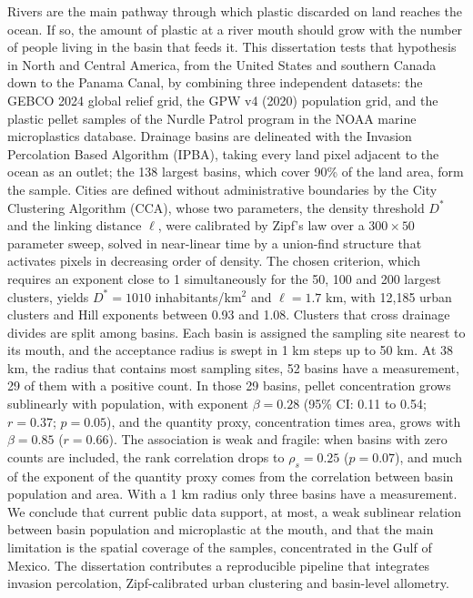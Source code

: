Rivers are the main pathway through which plastic discarded on land reaches the ocean. If so, the amount of plastic at a river mouth should grow with the number of people living in the basin that feeds it. This dissertation tests that hypothesis in North and Central America, from the United States and southern Canada down to the Panama Canal, by combining three independent datasets: the GEBCO 2024 global relief grid, the GPW v4 (2020) population grid, and the plastic pellet samples of the Nurdle Patrol program in the NOAA marine microplastics database. Drainage basins are delineated with the Invasion Percolation Based Algorithm (IPBA), taking every land pixel adjacent to the ocean as an outlet; the 138 largest basins, which cover 90\% of the land area, form the sample. Cities are defined without administrative boundaries by the City Clustering Algorithm (CCA), whose two parameters, the density threshold $D^{*}$ and the linking distance $\ell$, were calibrated by Zipf's law over a $300 \times 50$ parameter sweep, solved in near-linear time by a union-find structure that activates pixels in decreasing order of density. The chosen criterion, which requires an exponent close to 1 simultaneously for the 50, 100 and 200 largest clusters, yields $D^{*} = 1010$ inhabitants/km$^2$ and $\ell = 1.7$ km, with 12,185 urban clusters and Hill exponents between 0.93 and 1.08. Clusters that cross drainage divides are split among basins. Each basin is assigned the sampling site nearest to its mouth, and the acceptance radius is swept in 1 km steps up to 50 km. At 38 km, the radius that contains most sampling sites, 52 basins have a measurement, 29 of them with a positive count. In those 29 basins, pellet concentration grows sublinearly with population, with exponent $\beta = 0.28$ (95\% CI: 0.11 to 0.54; $r = 0.37$; $p = 0.05$), and the quantity proxy, concentration times area, grows with $\beta = 0.85$ ($r = 0.66$). The association is weak and fragile: when basins with zero counts are included, the rank correlation drops to $\rho_s = 0.25$ ($p = 0.07$), and much of the exponent of the quantity proxy comes from the correlation between basin population and area. With a 1 km radius only three basins have a measurement. We conclude that current public data support, at most, a weak sublinear relation between basin population and microplastic at the mouth, and that the main limitation is the spatial coverage of the samples, concentrated in the Gulf of Mexico. The dissertation contributes a reproducible pipeline that integrates invasion percolation, Zipf-calibrated urban clustering and basin-level allometry.

